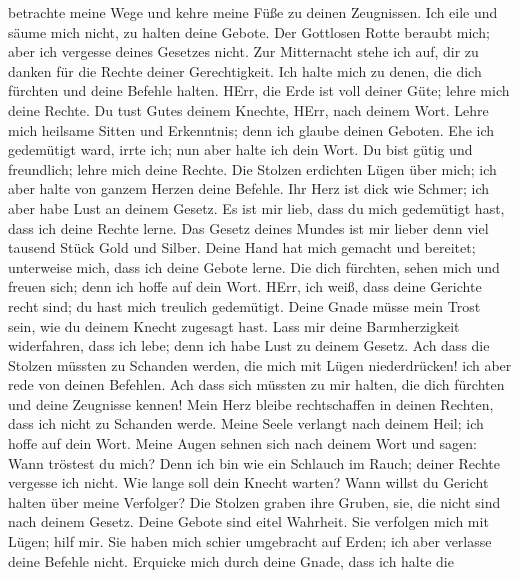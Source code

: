 betrachte meine Wege und kehre meine Füße zu deinen Zeugnissen.
 Ich eile und säume mich nicht, zu halten deine Gebote.
 Der Gottlosen Rotte beraubt mich; aber ich vergesse deines
Gesetzes nicht.  Zur Mitternacht stehe ich auf, dir zu
danken für die Rechte deiner Gerechtigkeit.  Ich halte mich
zu denen, die dich fürchten und deine Befehle halten. 
HErr, die Erde ist voll deiner Güte; lehre mich deine Rechte.
 Du tust Gutes deinem Knechte, HErr, nach deinem Wort.
 Lehre mich heilsame Sitten und Erkenntnis; denn ich glaube
deinen Geboten.  Ehe ich gedemütigt ward, irrte ich; nun
aber halte ich dein Wort.  Du bist gütig und freundlich;
lehre mich deine Rechte.  Die Stolzen erdichten Lügen über
mich; ich aber halte von ganzem Herzen deine Befehle.  Ihr
Herz ist dick wie Schmer; ich aber habe Lust an deinem Gesetz.
 Es ist mir lieb, dass du mich gedemütigt hast, dass ich
deine Rechte lerne.  Das Gesetz deines Mundes ist mir
lieber denn viel tausend Stück Gold und Silber.  Deine Hand
hat mich gemacht und bereitet; unterweise mich, dass ich deine Gebote
lerne.  Die dich fürchten, sehen mich und freuen sich; denn
ich hoffe auf dein Wort.  HErr, ich weiß, dass deine
Gerichte recht sind; du hast mich treulich gedemütigt. 
Deine Gnade müsse mein Trost sein, wie du deinem Knecht zugesagt hast.
 Lass mir deine Barmherzigkeit widerfahren, dass ich lebe;
denn ich habe Lust zu deinem Gesetz.  Ach dass die Stolzen
müssten zu Schanden werden, die mich mit Lügen niederdrücken! ich aber
rede von deinen Befehlen.  Ach dass sich müssten zu mir
halten, die dich fürchten und deine Zeugnisse kennen!  Mein
Herz bleibe rechtschaffen in deinen Rechten, dass ich nicht zu Schanden
werde.  Meine Seele verlangt nach deinem Heil; ich hoffe
auf dein Wort.  Meine Augen sehnen sich nach deinem Wort
und sagen: Wann tröstest du mich?  Denn ich bin wie ein
Schlauch im Rauch; deiner Rechte vergesse ich nicht.  Wie
lange soll dein Knecht warten? Wann willst du Gericht halten über meine
Verfolger?  Die Stolzen graben ihre Gruben, sie, die nicht
sind nach deinem Gesetz.  Deine Gebote sind eitel Wahrheit.
Sie verfolgen mich mit Lügen; hilf mir.  Sie haben mich
schier umgebracht auf Erden; ich aber verlasse deine Befehle nicht.
 Erquicke mich durch deine Gnade, dass ich halte die
